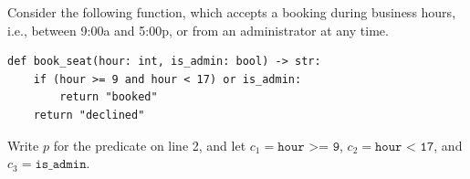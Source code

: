 \documentclass[addpoints, answers]{exam}
\begin{document}
\newpage
\begin{questions}

\question Consider the following function, which accepts a booking
  during business hours, i.e., between 9:00a and 5:00p, or from an
  administrator at any time.

\begin{verbatim}
def book_seat(hour: int, is_admin: bool) -> str:
    if (hour >= 9 and hour < 17) or is_admin:
        return "booked"
    return "declined"
\end{verbatim}

Write $p$ for the predicate on line 2, and let
$c_1 = \texttt{hour >= 9}$, $c_2 = \texttt{hour < 17}$, and
$c_3 = \texttt{is\_admin}$.

\end{questions}
\end{document}
